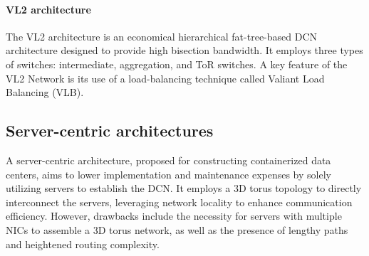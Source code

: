 \paragraph*{VL2 architecture}
The VL2 architecture is an economical hierarchical fat-tree-based DCN architecture designed to provide high bisection bandwidth. 
It employs three types of switches: intermediate, aggregation, and ToR switches. 
A key feature of the VL2 Network is its use of a load-balancing technique called Valiant Load Balancing (VLB).

\subsection{Server-centric architectures}
A server-centric architecture, proposed for constructing containerized data centers, aims to lower implementation and maintenance expenses by solely utilizing servers to establish the DCN. 
It employs a 3D torus topology to directly interconnect the servers, leveraging network locality to enhance communication efficiency. 
However, drawbacks include the necessity for servers with multiple NICs to assemble a 3D torus network, as well as the presence of lengthy paths and heightened routing complexity.